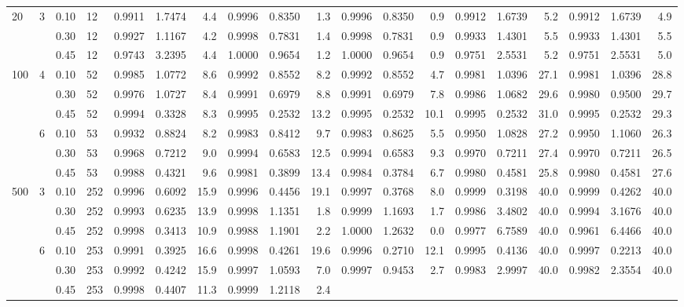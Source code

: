 \documentclass[thesis=B,english]{FITthesis}[2012/10/20]
\begin{document}
\begin{table}[h!]
\begin{adjustbox}{angle=90}
{\begin{tabular}{l|l|l|l|r|r|r|r|r|r|r|r|r|r|r|r|r|r|r|}
     20  & 3 & 0.10 & 12  &   0.9911 &  1.7474 &   4.4 &           0.9996 &  0.8350 &   1.3 &           0.9996 &  0.8350 &   0.9 &  0.9912 &   1.6739 &   5.2 &  0.9912 &   1.6739 &   4.9 \\    &   & 0.30 & 12  &   0.9927 &  1.1167 &   4.2 &           0.9998 &  0.7831 &   1.4 &           0.9998 &  0.7831 &   0.9 &  0.9933 &   1.4301 &   5.5 &  0.9933 &   1.4301 &   5.5 \\    &   & 0.45 & 12  &   0.9743 &  3.2395 &   4.4 &           1.0000 &  0.9654 &   1.2 &           1.0000 &  0.9654 &   0.9 &  0.9751 &   2.5531 &   5.2 &  0.9751 &   2.5531 &   5.0 \\100 & 4 & 0.10 & 52  &   0.9985 &  1.0772 &   8.6 &           0.9992 &  0.8552 &   8.2 &           0.9992 &  0.8552 &   4.7 &  0.9981 &   1.0396 &  27.1 &  0.9981 &   1.0396 &  28.8 \\    &   & 0.30 & 52  &   0.9976 &  1.0727 &   8.4 &           0.9991 &  0.6979 &   8.8 &           0.9991 &  0.6979 &   7.8 &  0.9986 &   1.0682 &  29.6 &  0.9980 &   0.9500 &  29.7 \\    &   & 0.45 & 52  &   0.9994 &  0.3328 &   8.3 &           0.9995 &  0.2532 &  13.2 &           0.9995 &  0.2532 &  10.1 &  0.9995 &   0.2532 &  31.0 &  0.9995 &   0.2532 &  29.3 \\    & 6 & 0.10 & 53  &   0.9932 &  0.8824 &   8.2 &           0.9983 &  0.8412 &   9.7 &           0.9983 &  0.8625 &   5.5 &  0.9950 &   1.0828 &  27.2 &  0.9950 &   1.1060 &  26.3 \\    &   & 0.30 & 53  &   0.9968 &  0.7212 &   9.0 &           0.9994 &  0.6583 &  12.5 &           0.9994 &  0.6583 &   9.3 &  0.9970 &   0.7211 &  27.4 &  0.9970 &   0.7211 &  26.5 \\    &   & 0.45 & 53  &   0.9988 &  0.4321 &   9.6 &           0.9981 &  0.3899 &  13.4 &           0.9984 &  0.3784 &   6.7 &  0.9980 &   0.4581 &  25.8 &  0.9980 &   0.4581 &  27.6 \\500 & 3 & 0.10 & 252 &   0.9996 &  0.6092 &  15.9 &           0.9996 &  0.4456 &  19.1 &           0.9997 &  0.3768 &   8.0 &  0.9999 &   0.3198 &  40.0 &  0.9999 &   0.4262 &  40.0 \\    &   & 0.30 & 252 &   0.9993 &  0.6235 &  13.9 &           0.9998 &  1.1351 &   1.8 &           0.9999 &  1.1693 &   1.7 &  0.9986 &   3.4802 &  40.0 &  0.9994 &   3.1676 &  40.0 \\    &   & 0.45 & 252 &   0.9998 &  0.3413 &  10.9 &           0.9988 &  1.1901 &   2.2 &           1.0000 &  1.2632 &   0.0 &  0.9977 &   6.7589 &  40.0 &  0.9961 &   6.4466 &  40.0 \\    & 6 & 0.10 & 253 &   0.9991 &  0.3925 &  16.6 &           0.9998 &  0.4261 &  19.6 &           0.9996 &  0.2710 &  12.1 &  0.9995 &   0.4136 &  40.0 &  0.9997 &   0.2213 &  40.0 \\    &   & 0.30 & 253 &   0.9992 &  0.4242 &  15.9 &           0.9997 &  1.0593 &   7.0 &           0.9997 &  0.9453 &   2.7 &  0.9983 &   2.9997 &  40.0 &  0.9982 &   2.3554 &  40.0 \\    &   & 0.45 & 253 &   0.9998 &  0.4407 &  11.3 &           0.9999 &  1.2118 &   2.4 &    
\end{tabular}}
\end{adjustbox}
\end{table}
\end{document}
